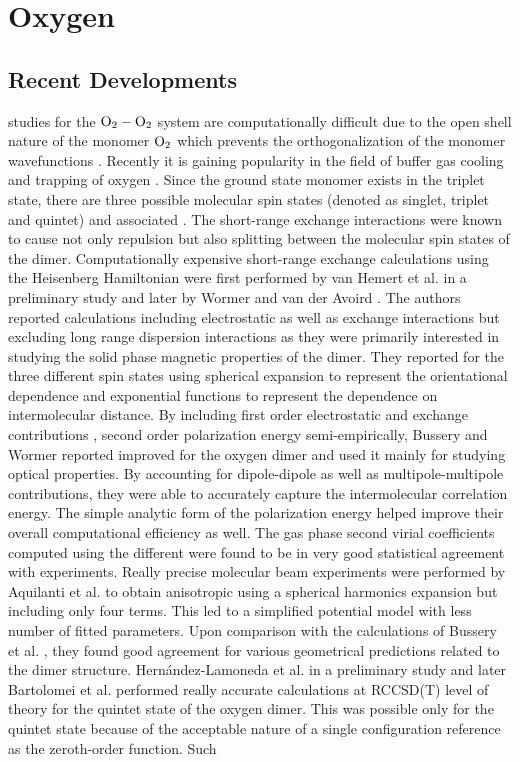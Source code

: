 \chapter{Oxygen}
\label{chap:o2}
\section{Recent Developments}
    \Abinitio{} studies for the ${\rm O_2 - O_2}$ system are computationally difficult due to the open shell nature of the monomer $\rm{O_2}$ which prevents the orthogonalization of the monomer wavefunctions \cite{Bussery1993}. Recently it is gaining popularity in the field of buffer gas cooling and trapping of oxygen \cite{Friedrich1998,Avdeenkov2001}. Since the ground state monomer exists in the triplet state, there are three possible molecular spin states (denoted as singlet, triplet and quintet) and associated \PESs{}. The short-range exchange interactions were known to cause not only repulsion but also splitting between the molecular spin states of the dimer. Computationally expensive short-range exchange calculations using the Heisenberg Hamiltonian were first performed by van Hemert et al. \cite{vanHemert1983} in a preliminary study and later by Wormer and van der Avoird \cite{Wormer1984}. The authors reported \abinitio{} calculations including electrostatic as well as exchange interactions but excluding long range dispersion interactions as they were primarily interested in studying the solid phase magnetic properties of the dimer. They reported \PESs{} for the three different spin states using spherical expansion to represent the orientational dependence and exponential functions to represent the dependence on intermolecular distance.  By including first order electrostatic and exchange contributions \abinitio{}, second order polarization energy semi-empirically, Bussery and Wormer \cite{Bussery1993} reported improved \PESs{} for the oxygen dimer and used it mainly for studying optical properties. By accounting for dipole-dipole as well as multipole-multipole contributions, they were able to accurately capture the intermolecular correlation energy. The simple analytic form of the polarization energy helped improve their overall computational efficiency as well. The gas phase second virial coefficients computed using the different \PESs{} were found to be in very good statistical agreement with experiments. Really precise molecular beam experiments were performed by Aquilanti et al. \cite{Aquilanti1999} to obtain anisotropic \PESs{} using a spherical harmonics expansion but including only four terms. This led to a simplified potential model with less number of fitted parameters. Upon comparison with the \abinitio{} calculations of Bussery et al. \cite{Bussery1993}, they found good agreement for various geometrical predictions related to the dimer structure. Hernández-Lamoneda et al. \cite{Lamoneda2005CPL} in a preliminary study and later Bartolomei et al. \cite{Bartolomei2008} performed really accurate \abinitio{} calculations at RCCSD(T) level of theory for the quintet state of the oxygen dimer. This was possible only for the quintet state because of the acceptable nature of a single configuration reference as the zeroth-order function. Such 